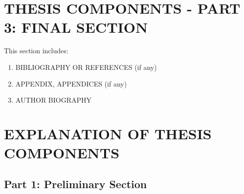 \section{THESIS COMPONENTS - PART 3: FINAL SECTION}

This section includes:
\begin{enumerate}
    \item BIBLIOGRAPHY OR REFERENCES (if any)
    \item APPENDIX, APPENDICES (if any)
    \item AUTHOR BIOGRAPHY
\end{enumerate}

\section{EXPLANATION OF THESIS COMPONENTS}

\subsection{Part 1: Preliminary Section}

